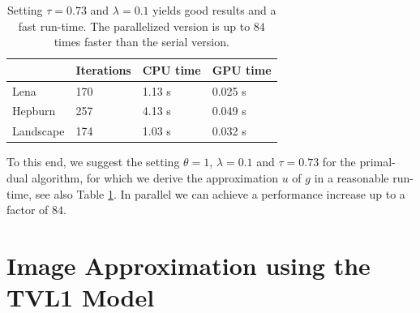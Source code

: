 \documentclass[abstracton]{scrreprt}
\begin{document}
            \begin{table}[!ht]
                \centering
                \begin{tabular}{| l || l | l | l |}
                    \hline
                    & Iterations & CPU time & GPU time \\ \hline
                    Lena & 170 & 1.13 s & 0.025 s \\ \hline
                    Hepburn & 257 & 4.13 s & 0.049 s \\ \hline
                    Landscape & 174 & 1.03 s & 0.032 s \\ \hline
                \end{tabular}
                \caption[Run-times for best parameters in ROF model.]{Setting $\tau = 0.73$ and $\lambda = 0.1$ yields good results and a fast run-time. The parallelized version is up to $84$ times faster than the serial version.}
                \label{tab:rof_cpu_vs_gpu}
            \end{table}

        To this end, we suggest the setting $\theta = 1$, $\lambda = 0.1$ and $\tau = 0.73$ for the primal-dual algorithm, for which we derive the approximation $u$ of $g$ in a reasonable run-time, see also Table \ref{tab:rof_cpu_vs_gpu}. In parallel we can achieve a performance increase up to a factor of $84$.

    \section{Image Approximation using the TVL1 Model} %
    \label{sec:image_approximation_using_the_tvl1_model}
\end{document}
